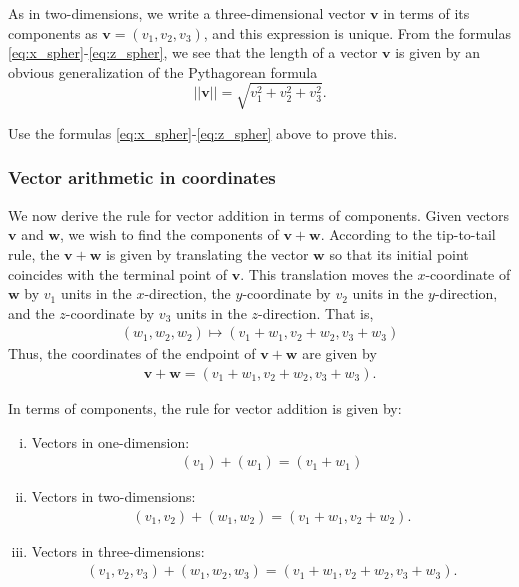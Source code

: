 \documentclass[12pt,letterpaper,reqno]{article}
\numberwithin{equation}{section}
\begin{document}
As in two-dimensions, we write a three-dimensional vector $\mathbf{v}$ in terms of its components as $\mathbf{v}=(v_1,v_2,v_3)$, and this expression is unique. From the formulas \eqref{eq:x_spher}-\eqref{eq:z_spher}, we see that the length of a vector $\mathbf{v}$ is given by an obvious generalization of the Pythagorean formula
\begin{equation}\label{eq:norm}
	||\mathbf{v}||=\sqrt{v_1^2+v_2^2+v_3^2}.
\end{equation}

\begin{exercise}
	Use the formulas \eqref{eq:x_spher}-\eqref{eq:z_spher} above to prove this.
\end{exercise}


\subsubsection{Vector arithmetic in coordinates}
We now derive the rule for vector addition in terms of components. Given vectors $\mathbf{v}$ and $\mathbf{w}$, we wish to find the components of $\mathbf{v}+\mathbf{w}$. According to the tip-to-tail rule, the $\mathbf{v}+\mathbf{w}$ is given by translating the vector $\mathbf{w}$ so that its initial point coincides with the terminal point of $\mathbf{v}$. This translation moves the $x$-coordinate of $\mathbf{w}$ by $v_1$ units in the $x$-direction, the $y$-coordinate by $v_2$ units in the $y$-direction, and the $z$-coordinate by $v_3$ units in the $z$-direction. That is, 
\begin{align*}
	(w_1,w_2,w_2) \mapsto (v_1+w_1,v_2+w_2,v_3+w_3)
\end{align*}
Thus, the coordinates of the endpoint of $\mathbf{v}+\mathbf{w}$ are given by
\begin{align*}
	\mathbf{v}+\mathbf{w}=(v_1+w_1,v_2+w_2,v_3+w_3).
\end{align*}
\begin{defn}\label{def:vector_addition}
	In terms of components, the rule for vector addition is given by:
\begin{enumerate}[(i)]
	\item Vectors in one-dimension:
	\begin{align*}
		(v_1)+(w_1)=(v_1+w_1)
	\end{align*}
	\item Vectors in two-dimensions:
	\begin{align*}
		(v_1,v_2)+(w_1,w_2)=(v_1+w_1,v_2+w_2).
	\end{align*}
	\item Vectors in three-dimensions:
	\begin{align*}
		(v_1,v_2,v_3)+(w_1,w_2,w_3)=(v_1+w_1,v_2+w_2,v_3+w_3).
	\end{align*}
\end{enumerate}
\end{defn}
\end{document}
